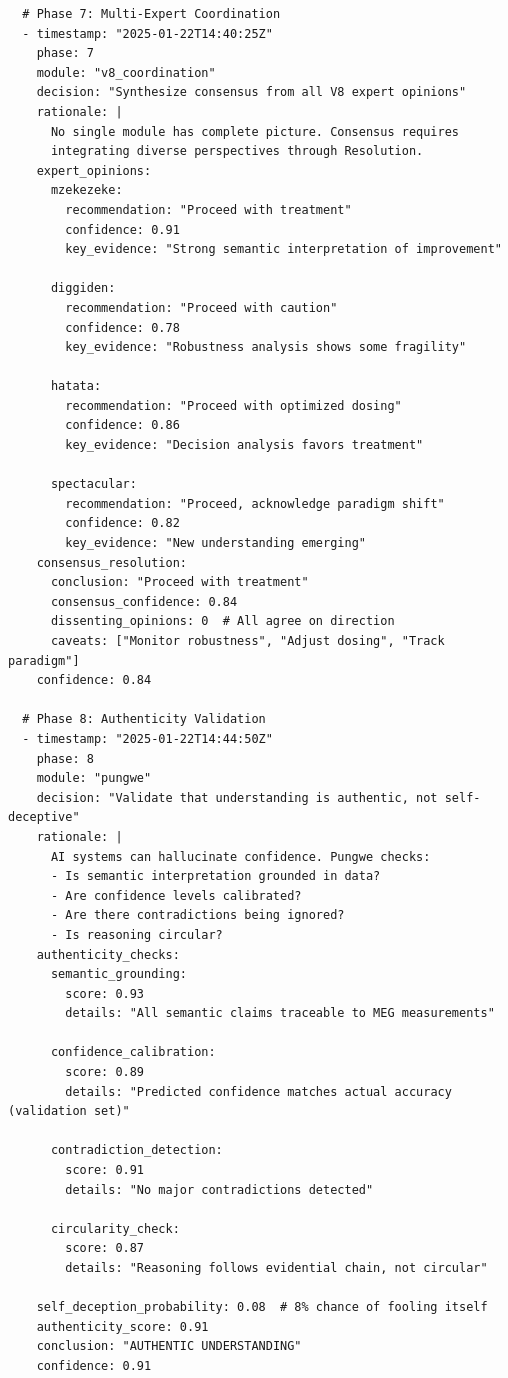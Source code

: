 \begin{verbatim}
  # Phase 7: Multi-Expert Coordination
  - timestamp: "2025-01-22T14:40:25Z"
    phase: 7
    module: "v8_coordination"
    decision: "Synthesize consensus from all V8 expert opinions"
    rationale: |
      No single module has complete picture. Consensus requires
      integrating diverse perspectives through Resolution.
    expert_opinions:
      mzekezeke:
        recommendation: "Proceed with treatment"
        confidence: 0.91
        key_evidence: "Strong semantic interpretation of improvement"
      
      diggiden:
        recommendation: "Proceed with caution"
        confidence: 0.78
        key_evidence: "Robustness analysis shows some fragility"
      
      hatata:
        recommendation: "Proceed with optimized dosing"
        confidence: 0.86
        key_evidence: "Decision analysis favors treatment"
      
      spectacular:
        recommendation: "Proceed, acknowledge paradigm shift"
        confidence: 0.82
        key_evidence: "New understanding emerging"
    consensus_resolution:
      conclusion: "Proceed with treatment"
      consensus_confidence: 0.84
      dissenting_opinions: 0  # All agree on direction
      caveats: ["Monitor robustness", "Adjust dosing", "Track paradigm"]
    confidence: 0.84
  
  # Phase 8: Authenticity Validation
  - timestamp: "2025-01-22T14:44:50Z"
    phase: 8
    module: "pungwe"
    decision: "Validate that understanding is authentic, not self-deceptive"
    rationale: |
      AI systems can hallucinate confidence. Pungwe checks:
      - Is semantic interpretation grounded in data?
      - Are confidence levels calibrated?
      - Are there contradictions being ignored?
      - Is reasoning circular?
    authenticity_checks:
      semantic_grounding:
        score: 0.93
        details: "All semantic claims traceable to MEG measurements"
      
      confidence_calibration:
        score: 0.89
        details: "Predicted confidence matches actual accuracy (validation set)"
      
      contradiction_detection:
        score: 0.91
        details: "No major contradictions detected"
      
      circularity_check:
        score: 0.87
        details: "Reasoning follows evidential chain, not circular"
    
    self_deception_probability: 0.08  # 8% chance of fooling itself
    authenticity_score: 0.91
    conclusion: "AUTHENTIC UNDERSTANDING"
    confidence: 0.91


\end{verbatim}
